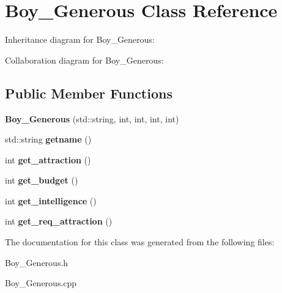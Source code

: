\hypertarget{classBoy__Generous}{}\section{Boy\+\_\+\+Generous Class Reference}
\label{classBoy__Generous}


Inheritance diagram for Boy\+\_\+\+Generous\+:


Collaboration diagram for Boy\+\_\+\+Generous\+:
\subsection*{Public Member Functions}
\begin{DoxyCompactItemize}
\item 
{\bfseries Boy\+\_\+\+Generous} (std\+::string, int, int, int, int)\hypertarget{classBoy__Generous_a0e8235c65c538d8e18ff6b6b57a11ca5}{}\label{classBoy__Generous_a0e8235c65c538d8e18ff6b6b57a11ca5}

\item 
std\+::string {\bfseries getname} ()\hypertarget{classBoy__Generous_aea0edd586e3f6d5a0869c74538d168c8}{}\label{classBoy__Generous_aea0edd586e3f6d5a0869c74538d168c8}

\item 
int {\bfseries get\+\_\+attraction} ()\hypertarget{classBoy__Generous_a0a10b03bdb232278697ef83c643b2ec9}{}\label{classBoy__Generous_a0a10b03bdb232278697ef83c643b2ec9}

\item 
int {\bfseries get\+\_\+budget} ()\hypertarget{classBoy__Generous_a9dd6c30fa3c3e00c24c9bada7bbcc98e}{}\label{classBoy__Generous_a9dd6c30fa3c3e00c24c9bada7bbcc98e}

\item 
int {\bfseries get\+\_\+intelligence} ()\hypertarget{classBoy__Generous_a3cdee506cd41eb79c3240ab95890b824}{}\label{classBoy__Generous_a3cdee506cd41eb79c3240ab95890b824}

\item 
int {\bfseries get\+\_\+req\+\_\+attraction} ()\hypertarget{classBoy__Generous_ab30d95a6677423bed63fb56765c7368a}{}\label{classBoy__Generous_ab30d95a6677423bed63fb56765c7368a}

\end{DoxyCompactItemize}


The documentation for this class was generated from the following files\+:\begin{DoxyCompactItemize}
\item 
Boy\+\_\+\+Generous.\+h\item 
Boy\+\_\+\+Generous.\+cpp\end{DoxyCompactItemize}
